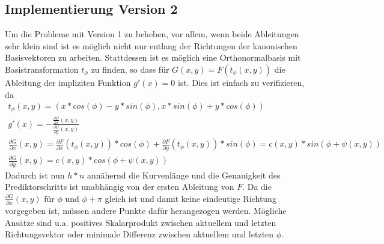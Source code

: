 \documentclass[a4paper,11pt,bibliography=totoc,listof=totoc,headinclude=true,cleardoublepage=empty,oneside]{scrartcl}
\newcommand{\diff}[2]{\frac{\partial #1}{\partial #2}}
\begin{document}
\subsection{Implementierung Version 2}
Um die Probleme mit Version 1 zu beheben, vor allem, wenn beide Ableitungen sehr klein sind ist es möglich nicht nur entlang der Richtungen der kanonischen Basisvektoren zu arbeiten. Stattdessen ist es möglich eine Orthonormalbasis mit Basistransformation $t_\phi$ zu finden, so dass für $G(x,y) = F(t_\phi(x,y))$ die Ableitung der impliziten Funktion $g'(x)=0$ ist.
Dies ist einfach zu verifizieren, da
\begin{align}
	t_\phi(x,y) = (x*cos(\phi)-y*sin(\phi), x*sin(\phi)+y*cos(\phi))\\
	g'(x) = -\frac{\diff{G}{x}(x,y)}{\diff{G}{y}(x,y)}\\
	\diff{G}{x}(x,y) = \diff{F}{x}(t_\phi(x,y))*cos(\phi)+\diff{F}{y}(t_\phi(x,y))*sin(\phi)=c(x,y)*sin(\phi + \psi(x,y))\\
	\diff{G}{y}(x,y)=c(x,y)*cos(\phi + \psi(x,y))
\end{align}
Dadurch ist nun $h*n$ annähernd die Kurvenlänge und die Genauigkeit des Prediktorschritts ist unabhängig von der ersten Ableitung von $F$.
Da die $\diff{G}{x}(x,y)$ für $\phi$ und $\phi+\pi$ gleich ist und damit keine eindeutige Richtung vorgegeben ist, müssen andere Punkte dafür herangezogen werden. Mögliche Ansätze sind u.a. positives Skalarprodukt zwischen aktuellem und letzten Richtungsvektor oder minimale Differenz zwischen aktuellem und letzten $\phi$.
\end{document}

